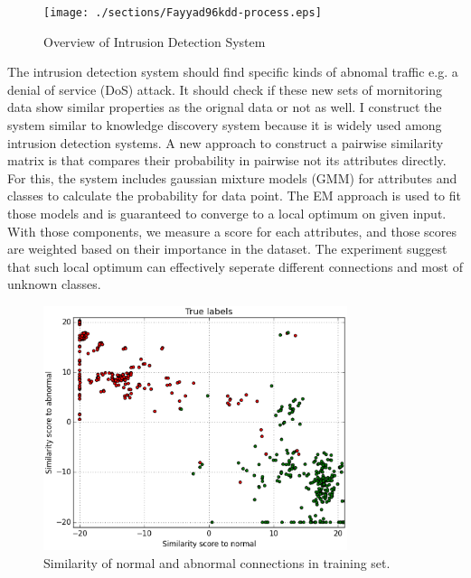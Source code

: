 \begin{figure}[htb2]
\begin{center}
\texttt{[image: ./sections/Fayyad96kdd-process.eps]}
\end{center}
\caption{Overview of Intrusion Detection System}
\label{fig:refSingleRobot1}
\end{figure}
The intrusion detection system should find specific kinds of abnomal traffic e.g. a denial of service (DoS) attack. 
It should check if these new sets of mornitoring data show similar properties as the orignal data or not as well. 
I construct the system similar to knowledge discovery system \cite{fayyad96} because it is widely used among intrusion detection systems. 
A new approach to construct a pairwise similarity matrix is that compares their probability in pairwise not its attributes directly. 
For this, the system includes gaussian mixture models (GMM) for attributes and classes to calculate the probability for data point.
The EM approach is used to fit those models and is guaranteed to converge to a local optimum on given input. 
With those components, we measure a score for each attributes, and those scores are weighted based on their importance in the dataset\cite{kayacik05}.
The experiment suggest that such local optimum can effectively seperate different connections and most of unknown classes. 
\begin{figure}[htb2]
\begin{center}
\includegraphics[width=3.5in,angle=0]{./sections/training20_only_true_.eps}
\end{center}
\caption{Similarity of normal and abnormal connections in training set.}
\label{fig:refSingleRobot1}
\end{figure}

